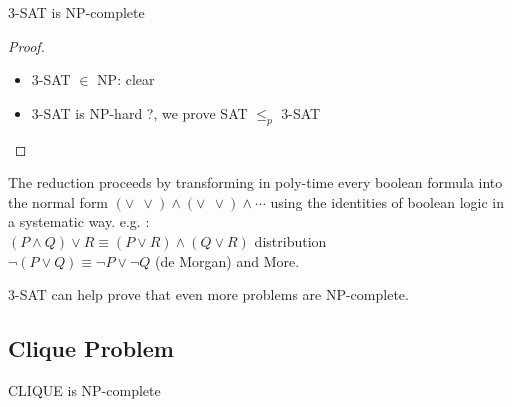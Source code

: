 \begin{theorem}
3-SAT is NP-complete
\end{theorem}
\begin{proof}
\begin{itemize}
\item 3-SAT $\in$ NP: clear
\item 3-SAT is NP-hard ?, we prove SAT $\leq_p$ 3-SAT
\end{itemize}
\end{proof}

The reduction proceeds by transforming in poly-time every boolean formula into the normal form $( \vee \ \ \vee ) \wedge ( \vee \ \ \vee) \wedge \cdots$ using the identities of boolean logic in a systematic way. e.g. : \\
$(P \wedge Q) \vee R \equiv (P \vee R) \wedge (Q \vee R)$ distribution \\
$ \neg (P \vee Q) \equiv \neg P \vee \neg Q$ (de Morgan) and More. 

3-SAT can help prove that even more problems are NP-complete. 

\subsection{Clique Problem}

\begin{theorem}
CLIQUE is NP-complete
\end{theorem}

